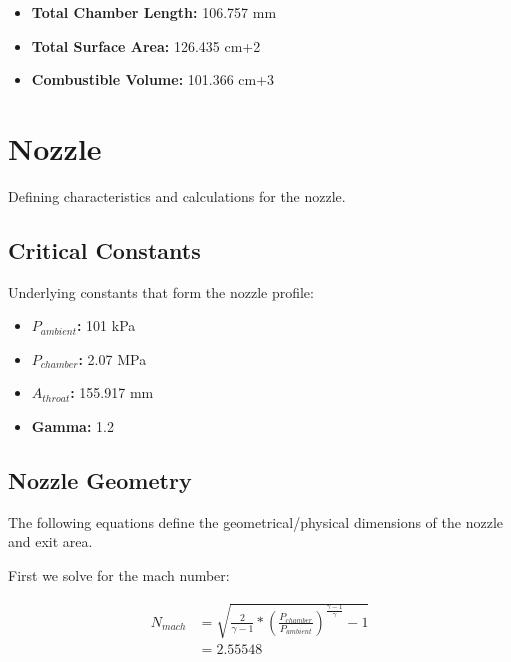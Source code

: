 \documentclass[12pt]{report}
\begin{document}
\begin{itemize}
	\item \textbf{Total Chamber Length:} 106.757 mm  
	\item \textbf{Total Surface Area:} 126.435 cm+2  
	\item \textbf{Combustible Volume:} 101.366 cm+3  
\end{itemize}








\newpage

\section{Nozzle}

Defining characteristics and calculations for the nozzle.


\subsection{Critical Constants}

Underlying constants that form the nozzle profile:

\begin{itemize}
	\item \textbf{$P_{ambient}$: } 101 kPa 
	\item \textbf{$P_{chamber}$: } 2.07 MPa 
	\item \textbf{$A_{throat}$: } 155.917 mm  
	\item \textbf{Gamma: } 1.2 
\end{itemize}




\subsection{Nozzle Geometry}

The following equations define the geometrical/physical dimensions of the nozzle and exit area.




First we solve for the mach number:



\begin{equation}
\begin{split}
\boldsymbol{\mathit{N_{mach}}} & = \sqrt{\frac{2}{\boldsymbol{\mathit{\gamma}} - 1} * {\left(\frac{\boldsymbol{\mathit{P_{chamber}}}}{\boldsymbol{\mathit{P_{ambient}}}}\right)}^{\frac{\boldsymbol{\mathit{\gamma}} - 1}{\boldsymbol{\mathit{\gamma}}}} - 1}\\
 & = 2.55548
\end{split}
\end{equation}
\end{document}
